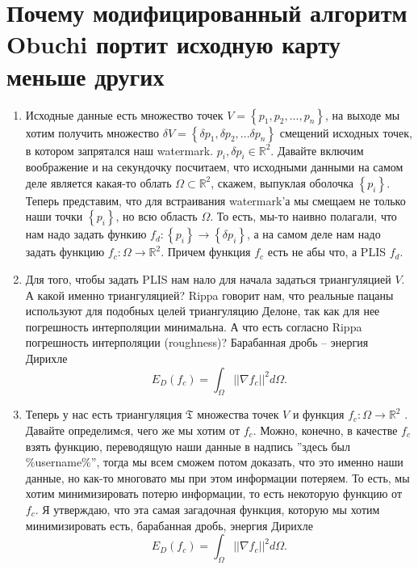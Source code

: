\documentclass{article}
\begin{document}
\section{Почему модифицированный алгоритм Obuchi портит исходную карту меньше других}
\begin{enumerate}
    \label{intro}
    \item Исходные данные есть множество точек $V = \left\{p_1, p_2, ... , p_n\right\}$, на выходе мы хотим получить множество 
    $\delta V = \left\{\delta {p_1}, \delta{p_2}, ... \delta{p_n} \right\}$ смещений исходных точек, 
    в котором запрятался наш watermark. $p_i, \delta{p_i} \in \mathbb{R}^2$. 
    Давайте включим воображение и на секундочку посчитаем, что исходными данными на самом деле является какая-то облать $\Omega \subset \mathbb{R}^2$,
    скажем, выпуклая оболочка $\left\{p_i\right\}$. Теперь представим, что для встраивания watermark'а мы смещаем не только наши точки $\left\{p_i\right\}$, 
    но всю область $\Omega$. То есть, мы-то наивно полагали, что нам надо задать функию $f_d: \left\{p_i\right\} \to \left\{\delta p_i \right\}$, 
    а на самом деле нам надо задать функцию $f_c: \Omega \to \mathbb{R}^2$. Причем функция $f_c$ есть не абы что, а PLIS $f_d$.
    
    \item Для того, чтобы задать PLIS нам нало для начала задаться триангуляцией $V$. А какой именно триангуляцией? 
    Rippa говорит нам, что реальные пацаны используют для подобных целей триангуляцию Делоне, так как для нее погрешность интерполяции минимальна. 
    А что есть согласно Rippa погрешность интерполяции (roughness)? Барабанная дробь -- энергия Дирихле $$E_D(f_c) = \int_{\Omega}{||{\nabla{f_c}}||^2 d\Omega}.$$
    
    \item \label{Criterion}
    Теперь у нас есть триангуляция $\mathfrak{T}$ множества точек $V$ и функция $f_c: \Omega \to \mathbb{R}^2$ . Давайте определимcя, чего же мы хотим от $f_c$.
    Можно, конечно, в качестве $f_c$ взять функцию, переводящую наши данные в надпись ''здесь был \%username\%'', тогда мы всем сможем потом доказать, 
    что это именно наши данные, но как-то многовато мы при этом информации потеряем. То есть, мы хотим минимизировать потерю информации, 
    то есть некоторую функцию от $f_c$. Я утверждаю, что эта самая загадочная функция, которую мы хотим минимизировать есть, барабанная дробь,
    энергия Дирихле $$E_D(f_c) = \int_{\Omega}{||{\nabla{f_c}}||^2 d\Omega}.$$
    

\end{enumerate}
\end{document}
